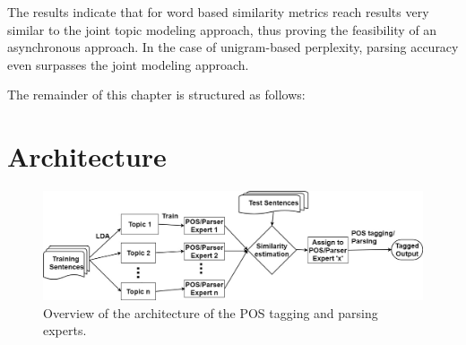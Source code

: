 The results indicate that for word based similarity metrics reach results very similar to the joint topic modeling approach, thus proving the feasibility of an asynchronous approach. In the case of unigram-based perplexity, parsing accuracy even surpasses the joint modeling approach.

The remainder of this chapter is structured as follows: 
 


\section{Architecture}\label{problemstat}

\begin{figure}[t]
    \centering
    \includegraphics[width=\textwidth]{figures/approach-new.jpg}
 \caption{Overview of the architecture of the POS tagging and parsing experts.}\label{fig:architecture}   
 \end{figure}







